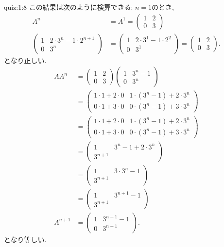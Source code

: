 \begin{answerof}{quiz:1:8}
  この結果は次のように検算できる:
  $n=1$のとき,
  \begin{align*}
    A^n&=A^1=
    \begin{pmatrix}
      1&2\\0&3
    \end{pmatrix}\\  
    \begin{pmatrix}1&2\cdot 3^{n}-1\cdot 2^{n+1}\\0&3^n\end{pmatrix}
      &=
      \begin{pmatrix}1&2\cdot 3^{1}-1\cdot 2^{2}\\0&3^1\end{pmatrix}
        =
    \begin{pmatrix}1&2\\0&3\end{pmatrix}      .
  \end{align*}
  となり正しい.
  \begin{align*}
    AA^n&=
    \begin{pmatrix}
      1&2\\0&3
    \end{pmatrix}
    \begin{pmatrix}1&3^{n}-1\\0&3^n\end{pmatrix}\\
      &=
    \begin{pmatrix}1\cdot 1+2\cdot 0&1\cdot(3^{n}-1)+2\cdot 3^n\\0\cdot 1+3\cdot 0&0\cdot (3^{n}-1)+3\cdot 3^n\end{pmatrix}\\
      &=
    \begin{pmatrix}1\cdot 1+2\cdot 0&1\cdot(3^{n}-1)+2\cdot 3^n\\0\cdot 1+3\cdot 0&0\cdot (3^{n}-1)+3\cdot 3^n\end{pmatrix}\\
      &=
    \begin{pmatrix}1&3^{n}-1+ 2\cdot 3^n\\3^{n+1}\end{pmatrix}\\
      &=
    \begin{pmatrix}1&3\cdot 3^{n}-1\\3^{n+1}\end{pmatrix}\\
      &=
    \begin{pmatrix}1&3^{n+1}-1\\3^{n+1}\end{pmatrix}\\
    A^{n+1}&=\begin{pmatrix}1&3^{n+1}-1\\0&3^{n+1}\end{pmatrix}.
  \end{align*}
  となり等しい.
\end{answerof}

